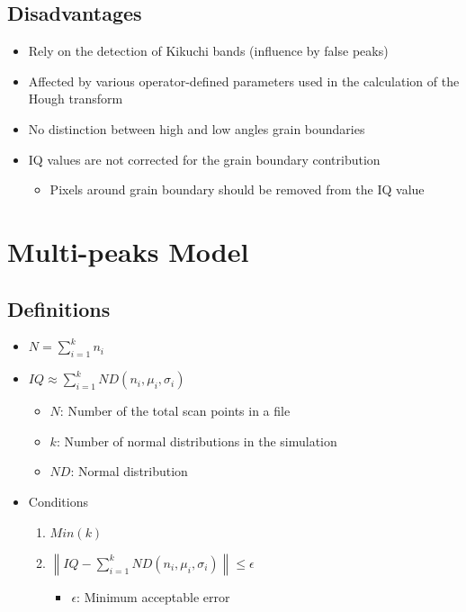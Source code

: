 \documentclass[letterpaper]{article}
\begin{document}
		\subsection{Disadvantages}
			\begin{itemize}
				\item Rely on the detection of Kikuchi bands (influence by false peaks) \cite{Tao2005}
				\item Affected by various operator-defined parameters used in the calculation of the Hough transform \cite{Wright2006}
				\item No distinction between high and low angles grain boundaries \cite{Wright2006}
				\item IQ values are not corrected for the grain boundary contribution \cite{Wu2005}
					\begin{itemize}
						\item Pixels around grain boundary should be removed from the IQ value
					\end{itemize}
			\end{itemize}

\newpage
	\section{Multi-peaks Model}
		\subsection{Definitions}
			\begin{itemize}
				\item $N = \sum\limits_{i=1}^k {n_i}$
				\item $IQ \approx \sum\limits_{i=1}^k {ND(n_i, \mu_i, \sigma_i)}$
					\begin{itemize}
						\item $N$: Number of the total scan points in a file
						\item $k$: Number of normal distributions in the simulation
						\item $ND$: Normal distribution
					\end{itemize}
				\item Conditions
					\begin{enumerate}
						\item $Min(k)$
						\item $\left\| IQ - \sum\limits_{i=1}^k {ND(n_i, \mu_i, \sigma_i)} \right\| \leq \epsilon$
							\begin{itemize}
								\item $\epsilon$: Minimum acceptable error
							\end{itemize}
					\end{enumerate}
			\end{itemize}
		
\end{document}
